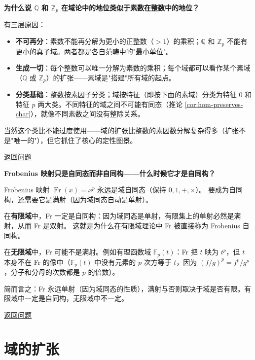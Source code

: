 \begin{exercise}\label{ex:ans-prime-field-analogy}
\hypertarget{ans:prime-field-analogy}{}
\textbf{为什么说 $\mathbb{Q}$ 和 $\mathbb{Z}_p$ 在域论中的地位类似于素数在整数中的地位？}

有三层原因：
\begin{itemize}
    \item \textbf{不可再分}：素数不能再分解为更小的正整数（$>1$）的乘积；$\mathbb{Q}$ 和 $\mathbb{Z}_p$ 不能有更小的真子域。两者都是各自范畴中的"最小单位"。
    \item \textbf{生成一切}：每个整数可以唯一分解为素数的乘积；每个域都可以看作某个素域（$\mathbb{Q}$ 或 $\mathbb{Z}_p$）的扩张——素域是"搭建"所有域的起点。
    \item \textbf{分类基础}：整数按素因子分类；域按特征（即按下面的素域）分类为特征 $0$ 和特征 $p$ 两大类。不同特征的域之间不可能有同态（推论 \ref{cor:hom-preserves-char}），就像不同素数之间没有整除关系。
\end{itemize}
当然这个类比不能过度使用——域的扩张比整数的素因数分解复杂得多（扩张不是"唯一的"），但它抓住了核心的定性图景。

\hyperlink{q:prime-field-analogy}{返回问题}
\end{exercise}

\begin{exercise}\label{ex:ans-frobenius-automorphism}
\hypertarget{ans:frobenius-automorphism}{}
\textbf{Frobenius 映射只是自同态而非自同构——什么时候它才是自同构？}

Frobenius 映射 $\operatorname{Fr}(x) = x^p$ 永远是域自同态（保持 $0, 1, +, \times$）。
要成为自同构，还需要它是满射（因为域同态自动是单射）。

在\textbf{有限域}中，Fr 一定是自同构：因为域同态是单射，有限集上的单射必然是满射，从而 Fr 是双射。
这就是为什么在有限域理论中 Fr 被直接称为 Frobenius 自同构。

在\textbf{无限域}中，Fr 可能不是满射。例如有理函数域 $\mathbb{F}_p(t)$：Fr 把 $t$ 映为 $t^p$，但 $t$ 本身不在 Fr 的像中（$\mathbb{F}_p(t)$ 中没有元素的 $p$ 次方等于 $t$，因为 $(f/g)^p = f^p/g^p$，分子和分母的次数都是 $p$ 的倍数）。

简而言之：Fr 永远单射（因为域同态的性质），满射与否则取决于域是否有限。有限域中一定是自同构，无限域中不一定。

\hyperlink{q:frobenius-automorphism}{返回问题}
\end{exercise}

\section{域的扩张}\label{sec:field-extension}

